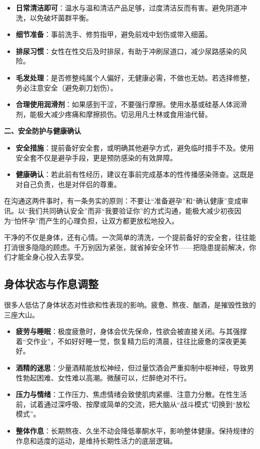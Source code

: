 \documentclass[12pt,UTF8]{ctexbook}
\begin{document}
\begin{itemize}
\item \textbf{日常清洁即可}：温水与温和清洁产品足够，过度清洁反而有害。避免阴道冲洗，以免破坏菌群平衡。
\item \textbf{细节准备}：事前洗手、修剪指甲，避免前戏中划伤或带入细菌。
\item \textbf{排尿习惯}：女性在性交后及时排尿，有助于冲刷尿道口，减少尿路感染的风险。
\item \textbf{毛发处理}：是否修整纯属个人偏好，无健康必需，不做也无妨。若选择修整，务必注意安全（避免剃刀划伤）。
\item \textbf{合理使用润滑剂}：如果感到干涩，不要强行摩擦。使用水基或硅基人体润滑剂，能极大减少疼痛和摩擦损伤。切忌用凡士林或食用油代替。
\end{itemize}

\textbf{二、安全防护与健康确认}

\begin{itemize}
\item \textbf{安全措施}：提前备好安全套，或明确其他避孕方式，避免临时措手不及。使用安全套不仅是避孕手段，更是预防感染的有效屏障。
\item \textbf{健康确认}：若此前有性经历，建议在事前完成基本的性传播感染筛查。这既是对自己负责，也是对伴侣的尊重。
\end{itemize}

在沟通这两件事时，有一条务实的原则：不要让“准备避孕”和“确认健康”变成审讯。以“我们共同确认安全”而非“我要验证你”的方式沟通，能极大减少初夜因为“怕怀孕”而产生的心理负担，让双方都更放松地投入。

\begin{tcolorbox}[colback=pink!5!white,colframe=red!50!black,title=贴心小叮咛]
干净的不仅是身体，还有心情。一次简单的清洗，一个提前备好的安全套，往往能打消很多隐隐的顾虑。千万别因为紧张，就省掉安全环节——把隐患提前解决，你们才能全身心投入去享受。
\end{tcolorbox}

\subsection{身体状态与作息调整}

很多人低估了身体状态对性欲和性表现的影响。疲惫、熬夜、酗酒，是摧毁性致的三座大山。

\begin{itemize}
\item \textbf{疲劳与睡眠}：极度疲惫时，身体会优先保命，性欲会被直接关闭。与其强撑着“交作业”，不如好好睡一觉，恢复精力后的清晨，往往比疲惫的深夜更美好。
\item \textbf{酒精的迷思}：少量酒精能放松神经，但过量饮酒会严重抑制中枢神经，导致男性勃起困难、女性难以高潮。微醺可以，烂醉绝对不行。
\item \textbf{压力与情绪}：工作压力、焦虑情绪会致使肌肉紧绷、注意力分散。在性生活前，试着通过深呼吸、按摩或简单的交流，把大脑从“战斗模式”切换到“放松模式”。
\item \textbf{整体作息}：长期熬夜、久坐不动会降低睾酮水平，影响整体健康。保持规律的作息和适度的运动，是维持长期性活力的底层逻辑。
\end{itemize}
\end{document}
